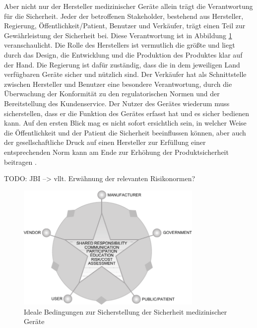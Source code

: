 \documentclass[a4paper,12pt]{report}
\begin{document}
Aber nicht nur der Hersteller medizinischer Geräte allein trägt die Verantwortung für die Sicherheit. Jeder der betroffenen Stakeholder, bestehend aus Hersteller, Regierung, Öffentlichkeit/Patient, Benutzer und Verkäufer, trägt einen Teil zur Gewährleistung der Sicherheit bei. Diese Verantwortung ist in Abbildung \ref{qs_shared_resp} veranschaulicht. Die Rolle des Herstellers ist vermutlich die größte und liegt durch das Design, die Entwicklung und die Produktion des Produktes klar auf der Hand. Die Regierung ist dafür zuständig, dass die in dem jeweiligen Land verfügbaren Geräte sicher und nützlich sind. Der Verkäufer hat als Schnittstelle zwischen Hersteller und Benutzer eine besondere Verantwortung, durch die Überwachung der Konformität zu den regulatorischen Normen und der Bereitstellung des Kundenservice. Der Nutzer des Gerätes wiederum muss sicherstellen, dass er die Funktion des Gerätes erfasst hat und es sicher bedienen kann. Auf den ersten Blick mag es nicht sofort ersichtlich sein, in welcher Weise die Öffentlichkeit und der Patient die Sicherheit beeinflussen können, aber auch der gesellschaftliche Druck auf einen Hersteller zur Erfüllung einer entsprechenden Norm kann am Ende zur Erhöhung der Produktsicherheit beitragen \citep[vgl.][S. 7f.]{Cheng2003}.

TODO: JBI --> vllt. Erwähnung der relevanten Risikonormen?
\begin{figure}[ht]
\centering
\includegraphics[width=0.8\textwidth]{Images/qs_shared_resp}
\caption[Ideale Bedingungen zur Sicherstellung der Sicherheit medizinischer Geräte]{Ideale Bedingungen zur Sicherstellung der Sicherheit medizinischer Geräte \citep[S. 8]{Cheng2003}}
\label{qs_shared_resp}
\end{figure}
\end{document}
